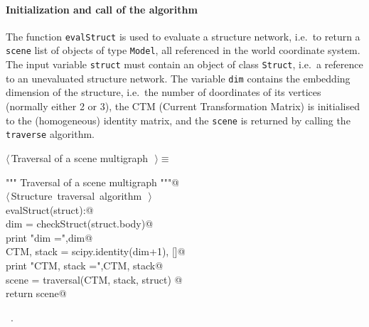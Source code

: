 \documentclass[11pt,oneside]{article}	%
\begin{document}
\paragraph{Initialization and call of the algorithm}

The function \texttt{evalStruct} is used to evaluate a structure network, i.e.~to return a \texttt{scene}
list of objects of type \texttt{Model}, all referenced in the world coordinate system. The input variable \texttt{struct} must contain an object of class \texttt{Struct}, i.e.~a reference to an unevaluated structure network. The variable \texttt{dim}  contains the embedding dimension of the structure, i.e.~the number of doordinates of its vertices (normally either 2 or 3), the CTM (Current Transformation Matrix) is initialised to the (homogeneous) identity matrix, and  the \texttt{scene} is returned by calling the \texttt{traverse} algorithm.

\begin{flushleft} \small \label{scrap36}
$\langle\,$Traversal of a scene multigraph\nobreak\ {\footnotesize {}}$\,\rangle\equiv$
\vspace{-1ex}
\begin{list}{}{} \item
\mbox{}\verb@""" Traversal of a scene multigraph """@\\
\mbox{}\verb@@\hbox{$\langle\,$Structure traversal algorithm\nobreak\ {\footnotesize {}}$\,\rangle$}\verb@@\\
\mbox{}\verb@def evalStruct(struct):@\\
\mbox{}\verb@   dim = checkStruct(struct.body)@\\
\mbox{}\verb@   print "\n dim =",dim@\\
\mbox{}\verb@   CTM, stack = scipy.identity(dim+1), []@\\
\mbox{}\verb@   print "\n CTM, stack =",CTM, stack@\\
\mbox{}\verb@   scene = traversal(CTM, stack, struct) @\\
\mbox{}\verb@   return scene@\\
\mbox{}\verb@@{\NWsep}
\end{list}
\vspace{-1ex}
\footnotesize\addtolength{\baselineskip}{-1ex}
\begin{list}{}{\setlength{\itemsep}{-\parsep}\setlength{\itemindent}{-\leftmargin}}
\item \NWtxtMacroRefIn\ .
\end{list}
\end{flushleft}
\end{document}
